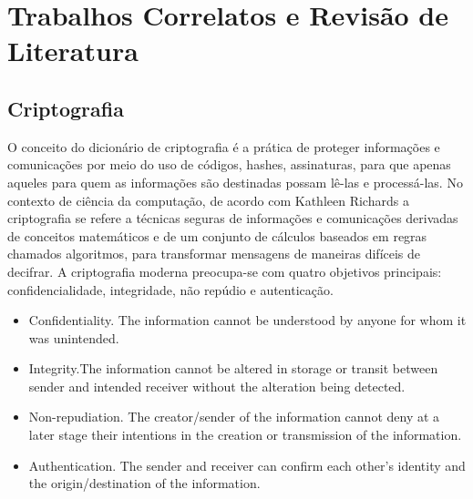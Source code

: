 \newcommand{\texCommand}[1]{\texttt{\textbackslash{#1}}}%

\newcommand{\exemplo}[1]{%
\vspace{\baselineskip}%
\noindent\fbox{\begin{minipage}{\textwidth}#1\end{minipage}}%
\\\vspace{\baselineskip}}%

\newcommand{\exemploVerbatim}[1]{%
\vspace{\baselineskip}%
\noindent\fbox{\begin{minipage}{\textwidth}%
#1\end{minipage}}%
\\\vspace{\baselineskip}}%



\section{Trabalhos Correlatos e Revisão de Literatura}

\subsection{Criptografia} %

O conceito do dicionário de criptografia é a prática de proteger informações e comunicações por meio do uso de códigos, hashes, assinaturas, para que apenas aqueles para quem as informações são destinadas possam lê-las e processá-las.
No contexto de ciência da computação, de acordo com Kathleen Richards \cite{what_is_cryptography} a criptografia se refere a técnicas seguras de informações e comunicações derivadas de conceitos matemáticos e de um conjunto de cálculos baseados em regras chamados algoritmos, para transformar mensagens de maneiras difíceis de decifrar.
A criptografia moderna preocupa-se com quatro objetivos principais: confidencialidade, integridade, não repúdio e autenticação.
\begin{itemize}
  \item Confidentiality. The information cannot be understood by anyone for whom it was unintended.
  \item Integrity.The information cannot be altered in storage or transit between sender and intended receiver without the alteration being detected.
  \item Non-repudiation. The creator/sender of the information cannot deny at a later stage their intentions in the creation or transmission of the information.
  \item Authentication. The sender and receiver can confirm each other's identity and the origin/destination of the information.
\end{itemize}

